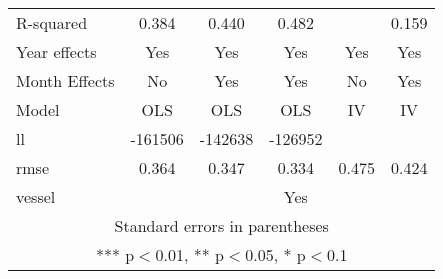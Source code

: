 \begin{tabular}{lccccc}
R-squared & 0.384 & 0.440 & 0.482 &  & 0.159 \\
Year effects & Yes & Yes & Yes & Yes & Yes \\
Month Effects & No & Yes & Yes & No & Yes \\
Model & OLS & OLS & OLS & IV & IV \\
ll & -161506 & -142638 & -126952 &  &  \\
rmse & 0.364 & 0.347 & 0.334 & 0.475 & 0.424 \\
 vessel &  &  & Yes &  &  \\ \hline
\multicolumn{6}{c}{ Standard errors in parentheses} \\
\multicolumn{6}{c}{ *** p$<$0.01, ** p$<$0.05, * p$<$0.1} \\
\end{tabular}
